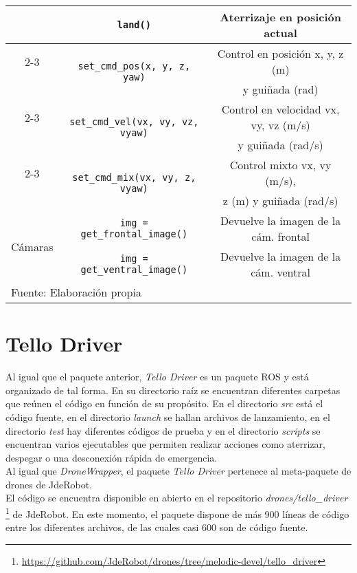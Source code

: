 \documentclass[../main.tex]{subfiles}
\begin{document}
\begin{table}[H]
{\begin{tabular}{|c|c|c|}
		& \lstinline{land()} & Aterrizaje en posición actual \\
		\cline{2-3}
		 & \multirow{2}{*}{\lstinline{set_cmd_pos(x, y, z, yaw)}} & Control en posición x, y, z (m) \\
		                                                        & & y guiñada (rad) \\
		\cline{2-3}
		 & \multirow{2}{*}{\lstinline{set_cmd_vel(vx, vy, vz, vyaw)} } & Control en velocidad vx, vy, vz (m/s)\\
		 & & y guiñada (rad/s) \\
		\cline{2-3}
		 & \multirow{2}{*}{\lstinline{set_cmd_mix(vx, vy, z, vyaw)}} & Control mixto vx, vy (m/s), \\
		 & & z (m) y guiñada (rad/s) \\
		\hline
		\multirow{2}{*}{Cámaras} & \multirow{1}{*}{\lstinline{img = get_frontal_image()}} & Devuelve la imagen de la cám. frontal \\
		\cline{2-3}
		& \multirow{1}{*}{\lstinline{img = get_ventral_image()}} & Devuelve la imagen de la cám. ventral \\
		\hline
		\multicolumn{3}{l}{Fuente: Elaboración propia}
	\end{tabular}}
\end{table}

\newpage
\section{Tello Driver} \label{section:infra-tello}
Al igual que el paquete anterior, \emph{Tello Driver} es un paquete ROS y está organizado de tal forma. En su directorio raíz se encuentran diferentes carpetas que reúnen el código en función de su propósito. En el directorio \emph{src} está el código fuente, en el directorio \emph{launch} se hallan archivos de lanzamiento, en el directorio \emph{test} hay diferentes códigos de prueba y en el directorio \emph{scripts} se encuentran varios ejecutables que permiten realizar acciones como aterrizar, despegar o una desconexión rápida de emergencia. \\
Al igual que \emph{DroneWrapper}, el paquete \emph{Tello Driver} pertenece al meta-paquete de drones de JdeRobot. \\
El código se encuentra disponible en abierto en el repositorio \emph{drones/tello\_driver} \footnote{\url{https://github.com/JdeRobot/drones/tree/melodic-devel/tello_driver}} de JdeRobot. En este momento, el paquete dispone de más 900 líneas de código entre los diferentes archivos, de las cuales casi 600 son de código fuente.
\end{document}
